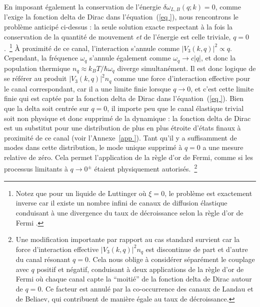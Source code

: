 \documentclass[aps,prd,notitlepage,amsfonts,amssymb,amsmath,nofootinbib,superscriptaddress,longbibliography]{revtex4-2}
\newcommand{\trad}[1]{\textcolor{tradcolor}{#1}}
\begin{document}
\trad{
En imposant également la conservation de l'énergie $\delta\omega_{L , B} \left( q;k \right) = 0$, comme l'exige la fonction delta de Dirac dans l'équation~(\ref{eq
}), nous rencontrons le problème anticipé ci-dessus : la seule solution exacte respectant à la fois la conservation de la quantité de mouvement {\it et} de l'énergie est celle triviale, $q=0$.~\footnote{Notez que pour un liquide de Luttinger où $\xi = 0$, le problème est exactement inverse car il existe un nombre infini de canaux de diffusion élastique conduisant à une divergence du taux de décroissance selon la règle d'or de Fermi \cite{andreev_hydrodynamics_1980,samokhin_lifetime_1998}.}
À proximité de ce canal, l'interaction s'annule comme $\left|V_{3}(k,q)\right|^{2} \propto q$. Cependant, la fréquence $\omega_{q}$ s'annule également comme $\omega_{q} \to c \left|q\right|$, et donc la population thermique $n_{q} \approx k_{B}T/\hbar \omega_{q}$ diverge simultanément. Il est donc logique de se référer au produit $\left| V_{3}(k,q) \right|^2 n_{q}$ comme une force d'interaction effective pour le canal correspondant, car il a une limite finie lorsque $q \to 0$, et c'est cette limite finie qui est captée par la fonction delta de Dirac dans l'équation~(\ref{eq
}). Bien que la delta soit centrée sur $q=0$, il importe peu que le canal élastique trivial soit non physique et donc supprimé de la dynamique : la fonction delta de Dirac est un substitut pour une distribution de plus en plus étroite d'états finaux à proximité de ce canal (voir l'Annexe~\ref{app
}). Tant qu'il y a suffisamment de modes dans cette distribution, le mode unique supprimé à $q=0$ a une mesure relative de zéro. Cela permet l'application de la règle d'or de Fermi, comme si les processus limitants à $q \to 0^{\pm}$ étaient physiquement autorisés.~\footnote{Une modification importante par rapport au cas standard survient car la force d'interaction effective $\left|V_{3}(k,q)\right|^{2} n_{q}$ est discontinue de part et d'autre du canal résonant $q=0$. Cela nous oblige à considérer séparément le couplage avec $q$ positif et négatif, conduisant à deux applications de la règle d'or de Fermi où chaque canal capte la ``moitié'' de la fonction delta de Dirac autour de $q=0$. Ce facteur est annulé par la co-occurrence des canaux de Landau et de Beliaev, qui contribuent de manière égale au taux de décroissance.}
}
\end{document}
